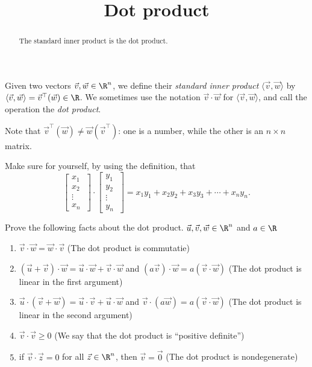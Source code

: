 \documentclass{ximera}
\title{Dot product}
\begin{document}
\begin{abstract}
  The standard inner product is the dot product.
\end{abstract}

\begin{definition}
  Given two vectors $\vec{v},\vec{w} \in \R^n$, we define their \textit{standard inner product} $\langle \vec{v}, \vec{w}\rangle$ by $\langle \vec{v},\vec{w} \rangle = \vec{v}^\top(\vec{w}) \in \R$.  We sometimes use the notation 
  $\vec{v} \cdot \vec{w}$ for $\langle \vec{v} , \vec{w} \rangle$, and call the operation the \textit{dot product}. 
\end{definition}

\begin{warning}
  Note that $\vec{v}^\top(\vec{w}) \neq \vec{w}(\vec{v}^\top)$: one is a number, while the other is an $n\times n$ matrix.
\end{warning}

\begin{question}
  Make sure for yourself, by using the definition, that 
  \[\begin{bmatrix} x_1 \\x_2\\ \vdots \\ x_n\ \end{bmatrix} \cdot \begin{bmatrix} y_1 \\y_2\\ \vdots \\ y_n\ \end{bmatrix}  = x_1y_1+x_2y_2+x_3y_3 + \cdots +x_ny_n.\]
\end{question}

Prove the following facts about the dot product.  $\vec{u},\vec{v},\vec{w} \in \R^n$ and $a \in \R$
\begin{enumerate}
\item $\vec{v} \cdot \vec{w} = \vec{w} \cdot \vec{v}$ (The dot product is commutatie)
			
\item $(\vec{u}+\vec{v})\cdot \vec{w} = \vec{u}\cdot \vec{w} + \vec{v}\cdot \vec{w}$ 	and $(a\vec{v})\cdot \vec{w} = a(\vec{v} \cdot \vec{w})$ (The dot product is linear in the first argument)
			
\item $\vec{u} \cdot (\vec{v}+\vec{w}) = \vec{u}\cdot \vec{v}+ \vec{u}\cdot \vec{w}$ and  $\vec{v} \cdot (a\vec{w}) = a(\vec{v} \cdot  \vec{w})$ (The dot product is linear in the second argument)
			
\item $\vec{v}\cdot \vec{v} \geq 0$ (We say that the dot product is ``positive definite'')
			
\item if $\vec{v} \cdot \vec{z} = 0$ for all $\vec{z} \in \R^n$, then $\vec{v} =\vec{0}$ (The dot product is nondegenerate)
\end{enumerate}
	
\end{document}

